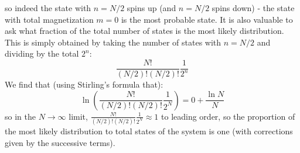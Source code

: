 so indeed the state with $n = N/2$ spins up (and $n = N/2$ spins down) - the state with total magnetization $m = 0$ is the most probable state. It is also valuable to ask what fraction of the total number of states is the most likely distribution. This is simply obtained by taking the number of states with $n = N/2$ and dividing by the total $2^n$:
\begin{equation}
    \frac{N!}{(N/2)!(N/2)!} \frac{1}{2^{n}}
\end{equation}
We find that (using Stirling's formula that):
\begin{equation}
    \ln( \frac{N!}{(N/2)!(N/2)!} \frac{1}{2^{N}}) = 0 + \frac{\ln N}{N}
\end{equation}
so in the $N \to \infty$ limit, $\frac{N!}{(N/2)!(N/2)!} \frac{1}{2^{N}} \approx 1$ to leading order, so the proportion of the most likely distribution to total states of the system is one (with corrections given by the successive terms).